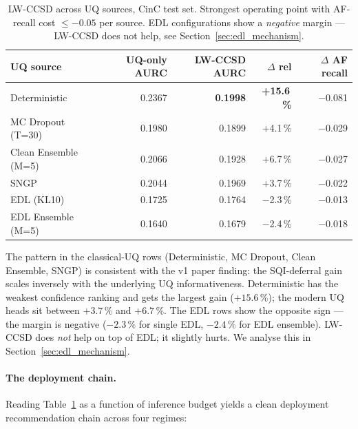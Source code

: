 \documentclass[journal]{IEEEtran}
\begin{document}
\begin{table}[t]
\centering
\caption{LW-CCSD across UQ sources, CinC test set. Strongest operating point with AF-recall cost $\leq -0.05$ per source. EDL configurations show a \emph{negative} margin --- LW-CCSD does not help, see Section~\ref{sec:edl_mechanism}.}
\label{tab:cross_uq}
\begin{tabular}{lrrrr}
\toprule
UQ source & UQ-only AURC & LW-CCSD AURC & $\Delta$ rel & $\Delta$ AF recall \\
\midrule
Deterministic        & 0.2367 & \textbf{0.1998} & \textbf{+15.6\,\%} & $-$0.081 \\
MC Dropout (T{=}30)  & 0.1980 & 0.1899          & +4.1\,\%   & $-$0.029 \\
Clean Ensemble (M{=}5) & 0.2066 & 0.1928        & +6.7\,\%   & $-$0.027 \\
SNGP                 & 0.2044 & 0.1969          & +3.7\,\%   & $-$0.022 \\
EDL (KL10)           & 0.1725 & 0.1764          & $-$2.3\,\% & $-$0.013 \\
EDL Ensemble (M{=}5) & 0.1640 & 0.1679          & $-$2.4\,\% & $-$0.018 \\
\bottomrule
\end{tabular}
\end{table}

The pattern in the classical-UQ rows (Deterministic, MC Dropout, Clean Ensemble, SNGP) is consistent with the v1 paper finding: the SQI-deferral gain scales inversely with the underlying UQ informativeness. Deterministic has the weakest confidence ranking and gets the largest gain ($+15.6\,\%$); the modern UQ heads sit between $+3.7\,\%$ and $+6.7\,\%$. The EDL rows show the opposite sign --- the margin is negative ($-2.3\,\%$ for single EDL, $-2.4\,\%$ for EDL ensemble). LW-CCSD does \emph{not} help on top of EDL; it slightly hurts. We analyse this in Section~\ref{sec:edl_mechanism}.

\paragraph{The deployment chain.} Reading Table~\ref{tab:cross_uq} as a function of inference budget yields a clean deployment recommendation chain across four regimes:
\end{document}
